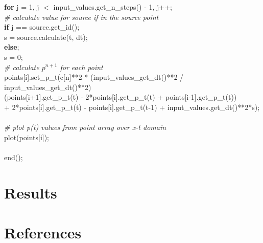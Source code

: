 \documentclass[]{article}
\begin{document}
\indent \textbf{for} j = 1, j $<$ input\_values.get\_n\_steps() - 1, j++; \\
\indent \indent \textit{\# calculate value for source if in the source point} \\
\indent \indent \textbf{if} j == source.get\_id(); \\
\indent \indent \indent s = source.calculate(t, dt); \\
\indent \indent \textbf{else}; \\
\indent \indent \indent s = 0; \\
\indent \indent \textit{\# calculate $p^{n+1}$ for each point} \\
\indent \indent points[i].set\_p\_t(c[n]**2 * (input\_values\_get\_dt()**2 / input\_values\_get\_dt()**2) \\
\indent \indent *(points[i+1].get\_p\_t(t) - 2*points[i].get\_p\_t(t) + points[i-1].get\_p\_t(t)) \\
\indent \indent + 2*points[i].get\_p\_t(t) - points[i].get\_p\_t(t-1) + input\_values.get\_dt()**2*s); \\
\\
\textit{\# plot p(t) values from point array over x-t domain} \\
plot(points[i]); \\
\\
end(); \\


\newpage

\section{Results}

\newpage

\section{References}

\newpage
\end{document}
